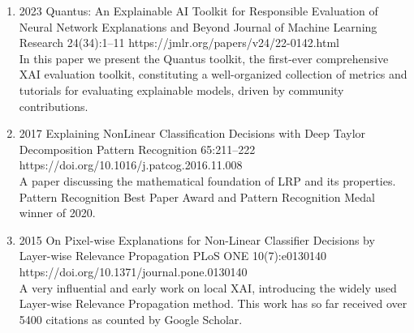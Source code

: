 \begin{enumerate}
            
            \item {}
                        {2023}
                        {Quantus: An Explainable AI Toolkit for Responsible Evaluation of Neural Network Explanations and Beyond}
                        {Journal of Machine Learning Research}
                        {24(34):1--11}
                        {https://jmlr.org/papers/v24/22-0142.html}
                        {\\
                        In this paper we present the Quantus toolkit, the first-ever comprehensive XAI evaluation toolkit, constituting a well-organized collection of metrics and tutorials for evaluating explainable models, driven by community contributions.
                        }
                            
                            
            \item
                                {2017}
                                {Explaining NonLinear Classification Decisions with Deep Taylor Decomposition}
                                {Pattern Recognition}
                                {65:211--222}
                                {https://doi.org/10.1016/j.patcog.2016.11.008}
                                {\\A paper discussing the mathematical foundation of LRP and its properties. Pattern Recognition Best Paper Award and Pattern Recognition Medal winner of 2020.}

            \item
                            {2015}
                            {On Pixel-wise Explanations for Non-Linear Classifier Decisions by Layer-wise Relevance Propagation}
                            {PLoS ONE}
                            {10(7):e0130140}
                            {https://doi.org/10.1371/journal.pone.0130140}
                            {\\A very influential and early work on local XAI, introducing the widely used Layer-wise Relevance Propagation method. This work has so far received over 5400 citations as counted by Google Scholar.}
        
        \end{enumerate}
    

